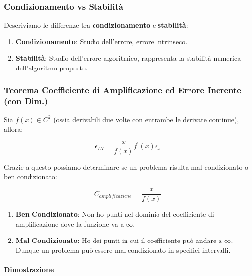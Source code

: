 \documentclass{article}
\begin{document}
\newpage

\subsubsection{Condizionamento vs Stabilità}

Descriviamo le differenze tra \textbf{condizionamento} e \textbf{stabilità}:

\begin{enumerate}
    \item \textbf{Condizionamento}: Studio dell'errore, errore intrinseco.
    \item \textbf{Stabilità}: Studio dell'errore algoritmico, rappresenta la stabilità
    \newline
    numerica dell'algoritmo proposto.
\end{enumerate}

\subsubsection{Teorema Coefficiente di Amplificazione ed Errore Inerente (con Dim.)}

Sia $f(x) \in C^{2}$ (ossia derivabili due volte con entrambe le derivate continue), allora:

\[ \boxed{\epsilon_{IN} = \frac{x}{f(x)}f^{'}(x)\epsilon_{x}} \]

Grazie a questo possiamo determinare se un problema risulta mal condizionato o ben condizionato:

\[ \boxed{C_{amplificazione} = \frac{x}{f(x)}} \]

\vspace*{5px}

\begin{enumerate}
    \item \textbf{Ben Condizionato}: Non ho punti nel dominio del coefficiente di amplificazione dove la funzione va a $\infty$.
    \item \textbf{Mal Condizionato}: Ho dei punti in cui il coefficiente può andare a $\infty$. Dunque un problema può essere mal condizionato in specifici intervalli.
\end{enumerate}

\paragraph{Dimostrazione}
\end{document}
